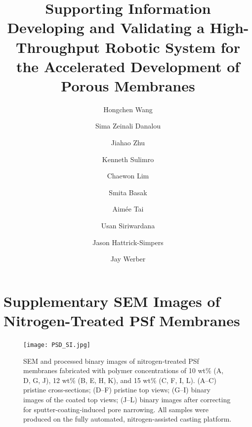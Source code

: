 \documentclass[preprint,12pt]{elsarticle}
\begin{document}
\begin{frontmatter}

\title{\textbf{Supporting Information}\\[4pt]
\large Developing and Validating a High-Throughput Robotic System for the Accelerated Development of Porous Membranes}

\author[1]{Hongchen Wang}
\author[2]{Sima Zeinali Danalou}
\author[2]{Jiahao Zhu}
\author[2]{Kenneth Sulimro}
\author[3]{Chaewon Lim}
\author[4]{Smita Basak}
\author[1]{Aim\'ee Tai}
\author[4]{Usan Siriwardana}
\author[1]{Jason Hattrick-Simpers }
\author[2]{Jay Werber }



\end{frontmatter}
\clearpage

\section{Supplementary SEM Images of Nitrogen-Treated PSf Membranes}

\begin{figure}[ht]
\centering
\texttt{[image: PSD\_SI.jpg]}
\caption{SEM and processed binary images of nitrogen‑treated PSf membranes fabricated with polymer concentrations of 10 wt\% (A, D, G, J), 12 wt\% (B, E, H, K), and 15 wt\% (C, F, I, L). (A–C) pristine cross‑sections; (D–F) pristine top views; (G–I) binary images of the coated top views; (J–L) binary images after correcting for sputter‑coating‑induced pore narrowing. All samples were produced on the fully automated, nitrogen‑assisted casting platform.}
\label{PSD_SI.jpg}
\end{figure}
\clearpage
\end{document}

